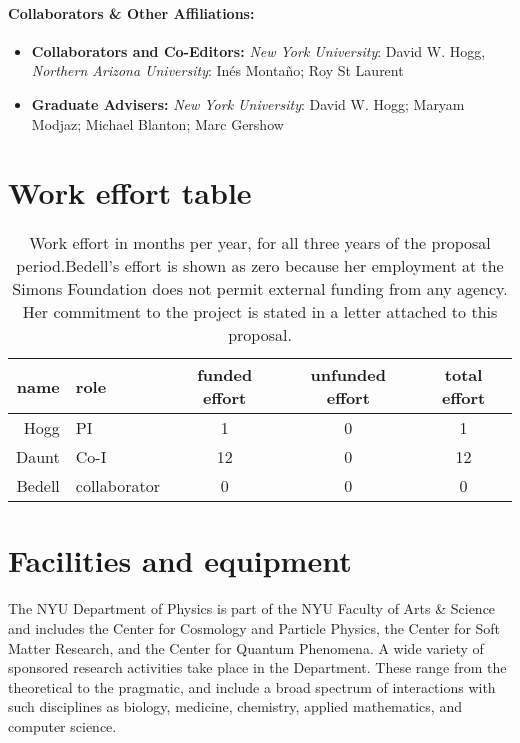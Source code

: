 \documentclass[12pt]{article}
\begin{document}
\paragraph{Collaborators \& Other Affiliations:}

\begin{itemize}
    \item \textbf{Collaborators and Co-Editors:}
        \emph{New York University}:
            David W. Hogg,
        \emph{Northern Arizona University}:
            In\'es Monta\~no;
            Roy St Laurent
    \item \textbf{Graduate Advisers:}
        \emph{New York University}:
            David W. Hogg;
            Maryam Modjaz;
            Michael Blanton;
            Marc Gershow
\end{itemize}

\clearpage
\section*{Work effort table}

\begin{table}[h!]
\sffamily\begin{center}
\begin{tabular}{|r|l|c|c|c|}
\hline
name & role & funded effort & unfunded effort & total effort\\
\hline
\hline
    Hogg &           PI &  1 &  0 &  1 \\
   Daunt &         Co-I & 12 &  0 & 12 \\
  Bedell & collaborator &  0 &  0 &  0 \\
\hline
\end{tabular}
\vspace{-2ex}
\end{center}
\caption{Work effort in months per year, for all three years of the proposal period.\label{tab:work}
Bedell's effort is shown as zero because her employment at the Simons Foundation does not permit external funding from any agency.
Her commitment to the project is stated in a letter attached to this proposal.}
\end{table}

\clearpage
\section*{Facilities and equipment}

The NYU Department of Physics is part of the NYU Faculty of Arts \&
Science and includes the Center for Cosmology and Particle Physics,
the Center for Soft Matter Research, and the Center for Quantum Phenomena.
A wide variety of sponsored
research activities take place in the Department.  These range from
the theoretical to the pragmatic, and include a broad spectrum of
interactions with such disciplines as biology, medicine, chemistry,
applied mathematics, and computer science.
\end{document}

